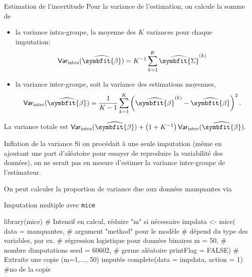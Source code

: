 \documentclass[
  ignorenonframetext,
]{beamer}
\newenvironment{Shaded}{\begin{snugshade}}{\end{snugshade}}
\newcommand{\AttributeTok}[1]{\textcolor[rgb]{0.40,0.45,0.13}{#1}}
\newcommand{\CommentTok}[1]{\textcolor[rgb]{0.37,0.37,0.37}{#1}}
\newcommand{\ConstantTok}[1]{\textcolor[rgb]{0.56,0.35,0.01}{#1}}
\newcommand{\DecValTok}[1]{\textcolor[rgb]{0.68,0.00,0.00}{#1}}
\newcommand{\FunctionTok}[1]{\textcolor[rgb]{0.28,0.35,0.67}{#1}}
\newcommand{\NormalTok}[1]{\textcolor[rgb]{0.00,0.23,0.31}{#1}}
\newcommand{\OtherTok}[1]{\textcolor[rgb]{0.00,0.23,0.31}{#1}}
\providecommand{\tightlist}{%
  \setlength{\itemsep}{0pt}\setlength{\parskip}{0pt}}\usepackage{longtable,booktabs,array}
\renewcommand{\boldsymbol}[1]{\symbfit{#1}}
\begin{document}
\begin{frame}{Estimation de l'incertitude}
\label{estimation-de-lincertitude}
Pour la variance de l'estimation, on calcule la somme de

\begin{itemize}
\tightlist
\item
  la variance intra-groupe, la moyenne des \(K\) variances pour chaque
  imputation:
  \[\mathsf{Var}_{\text{intra}}(\widehat{\boldsymbol{\beta}}) = K^{-1}\sum_{k=1}^K\widehat{\boldsymbol{\Sigma}}^{(k)}\]
\item
  la variance inter-groupe, soit la variance des estimations moyennes,
  \[\mathsf{Var}_{\text{inter}}(\widehat{\boldsymbol{\beta}}) = \frac{1}{K-1}\sum_{k=1}^K \left(
  \widehat{\boldsymbol{\beta}}^{(k)} - \widehat{\boldsymbol{\beta}}\right)^2.\]
\end{itemize}

La variance totale est
\(\mathsf{Var}_{\text{intra}}(\widehat{\boldsymbol{\beta}}) + \left(1+K^{-1}\right)\mathsf{Var}_{\text{inter}}(\widehat{\boldsymbol{\beta}}).\)
\end{frame}

\begin{frame}{Inflation de la variance}
\label{inflation-de-la-variance}
Si on procédait à une seule imputation (même en ajoutant une part
d'aléatoire pour essayer de reproduire la variabilité des données), on
ne serait pas en mesure d'estimer la variance inter-groupe de
l'estimateur.

On peut calculer la proportion de variance due aux données manquantes
via
\end{frame}

\begin{frame}[fragile]{Imputation multiple avec \texttt{mice}}
\label{imputation-multiple-avec-mice}
\begin{Shaded}
\begin{Highlighting}[numbers=left,,]
\FunctionTok{library}\NormalTok{(mice)}
\CommentTok{\# Intensif en calcul, réduire "m" si nécessaire}
\NormalTok{impdata }\OtherTok{\textless{}{-}} \FunctionTok{mice}\NormalTok{(}
   \AttributeTok{data =}\NormalTok{ manquantes,}
   \CommentTok{\# argument "method" pour le modèle}
   \CommentTok{\# dépend du type des variables, par ex.}
   \CommentTok{\# régression logistique pour données binaires}
   \AttributeTok{m =} \DecValTok{50}\NormalTok{, }\CommentTok{\# nombre d\textquotesingle{}imputations}
   \AttributeTok{seed =} \DecValTok{60602}\NormalTok{, }\CommentTok{\# germe aléatoire}
   \AttributeTok{printFlag =} \ConstantTok{FALSE}\NormalTok{)}
\CommentTok{\# Extraite une copie (m=1,..., 50) imputée }
\FunctionTok{complete}\NormalTok{(}\AttributeTok{data =}\NormalTok{ impdata, }
         \AttributeTok{action =} \DecValTok{1}\NormalTok{) }\CommentTok{\#no de la copie}
\end{Highlighting}
\end{Shaded}
\end{frame}
\end{document}
